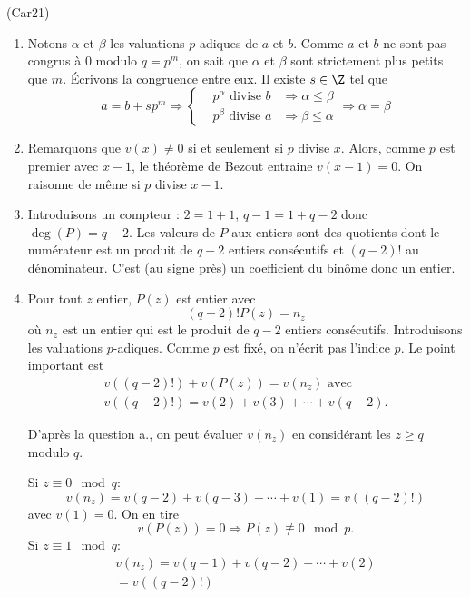 \begin{tiny}(Car21)\end{tiny}
\begin{enumerate}
  \item Notons $\alpha$ et $\beta$ les valuations $p$-adiques de $a$ et $b$. Comme $a$ et $b$ ne sont pas congrus à $0$ modulo $q=p^m$, on sait que $\alpha$ et $\beta$ sont strictement plus petits que $m$. \'Ecrivons la congruence entre eux. Il existe $s\in \Z$ tel que
\begin{displaymath}
  a = b + s p^m \Rightarrow 
\left\lbrace  
\begin{aligned}
  &p^\alpha \text{ divise } b &\Rightarrow \alpha \leq \beta \\
  &p^\beta \text{ divise } a &\Rightarrow  \beta \leq \alpha 
\end{aligned}
\right. \Rightarrow \alpha = \beta
\end{displaymath}

  \item Remarquons que $v(x)\neq 0$ si et seulement si $p$ divise $x$. Alors, comme $p$ est premier avec $x-1$, le théorème de Bezout entraine $v(x-1) = 0$. On raisonne de même si $p$ divise $x-1$.

  \item Introduisons un compteur : $2=1+1$, $q-1 = 1 +q-2$ donc $\deg(P) = q-2$. Les valeurs de $P$ aux entiers sont des quotients dont le numérateur est un produit de $q-2$ entiers consécutifs et $(q-2)!$ au dénominateur. C'est (au signe près) un coefficient du binôme donc un entier. 
  
  \item Pour tout $z$ entier, $P(z)$ est entier avec 
\[
(q-2)!P(z) = n_z 
\]
où $n_z$ est un entier qui est le produit de $q-2$ entiers consécutifs. Introduisons les valuations $p$-adiques. Comme $p$ est fixé, on n'écrit pas l'indice $p$. Le point important est
\begin{multline*}
  v((q-2)!) + v(P(z)) = v(n_z) \text{ avec }  \\
  v((q-2)!) = v(2) + v(3) + \cdots + v(q-2).
\end{multline*}

D'après la question a., on peut évaluer $v(n_z)$ en considérant les $z\geq q$ modulo $q$.

Si $z\equiv 0 \mod q$:
\begin{displaymath}
  v(n_z) = v(q-2) + v(q-3) + \cdots + v(1)
= v((q-2)!)
\end{displaymath}
avec $v(1)=0$. On en tire 
\[
v(P(z))=0 \Rightarrow P(z) \not\equiv 0 \mod p. 
\]
Si $z\equiv 1 \mod q$:
\begin{multline*}
  v(n_z) = v(q-1) + v(q-2) + \cdots + v(2)\\ = v((q-2)!)
\end{multline*}


\end{enumerate}
